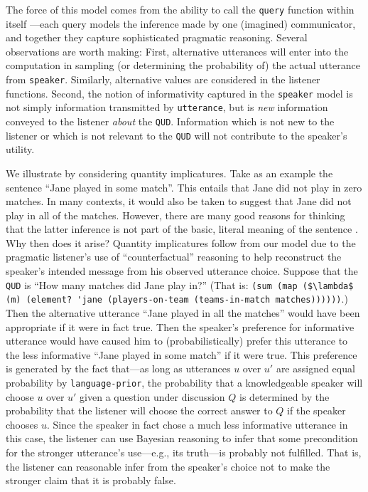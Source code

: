 \documentclass[pdfextras]{handbook}
\begin{document}
The force of this model comes from the ability to call the \lstinline{query} function within itself \citep{Stuhlmueller2013}---each query models the inference made by one (imagined) communicator, and together they capture sophisticated pragmatic reasoning. 
Several observations are worth making: First, alternative utterances will enter into the computation in sampling (or determining the probability of) the actual utterance from \lstinline{speaker}. 
Similarly, alternative values are considered in the listener functions.
Second, the notion of informativity captured in the \lstinline{speaker} model is not simply information transmitted by \lstinline{utterance}, but is \emph{new} information conveyed to the listener \emph{about} the \lstinline{QUD}. 
Information which is not new to the listener or which is not relevant to the \lstinline{QUD} will not contribute to the speaker's utility.

We illustrate by considering quantity implicatures. 
Take as an example the sentence ``Jane played in some match''. 
This entails that Jane did not play in zero matches. 
In many contexts, it would also be taken to suggest that Jane did not play in all of the matches. 
However, there are many good reasons for thinking that the latter inference is not part of the basic, literal meaning of the sentence \citep{grice89,geurts2010quantity}. 
Why then does it arise?
%
Quantity implicatures follow from our model due to the pragmatic listener's use of ``counterfactual'' reasoning to help reconstruct the speaker's intended message from his observed utterance choice.
Suppose that the \lstinline{QUD} is ``How many matches did Jane play in?'' (That is: 
\lstinline[mathescape]{(sum (map ($\lambda$ (m) (element? 'jane (players-on-team (teams-in-match matches))))))}.)
Then the alternative utterance ``Jane played in all the matches'' would have been appropriate if it were in fact true. 
Then the speaker's preference for informative utterance would have caused him to (probabilistically) prefer this utterance to the less informative ``Jane played in some match'' if it were true. 
This preference is generated by the fact that---as long as utterances $u$ over $u'$ are assigned equal probability by \lstinline{language-prior}, the probability that a knowledgeable speaker will choose $u$ over $u'$ given a question under discussion $Q$ is determined by the probability that the listener will choose the correct answer to $Q$ if the speaker chooses $u$.
Since the speaker in fact chose a much less informative utterance in this case, the listener can use Bayesian reasoning to infer that some precondition for the stronger utterance's use---e.g., its truth---is probably not fulfilled. 
That is, the listener can reasonable infer from the speaker's choice not to make the stronger claim that it is probably false.
\end{document}

